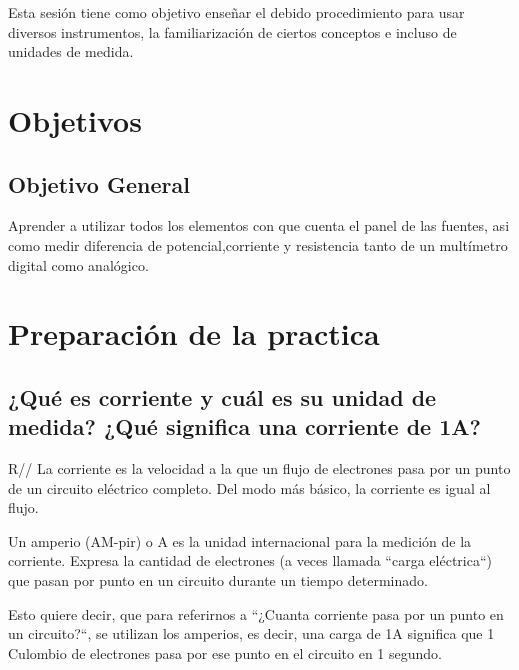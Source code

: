 \documentclass[letterpaper, 12pt]{report}
\begin{document}
Esta sesión tiene como objetivo enseñar el debido procedimiento
para usar diversos instrumentos, la familiarización de ciertos conceptos 
e incluso de unidades de medida.

\newpage

\section{Objetivos}

\subsection{Objetivo General}

Aprender a utilizar todos los elementos con que cuenta el panel de las 
fuentes, asi como medir diferencia de potencial,corriente y resistencia 
tanto de un multímetro digital como analógico.

\section{Preparación de la practica}

\subsection{¿Qué es corriente y cuál es su unidad de medida? ¿Qué significa
	una corriente de 1A?}

R// La corriente es la velocidad a la que un flujo de electrones pasa por un
punto de un circuito eléctrico completo. Del modo más básico,
la corriente es igual al flujo.~\cite{DefinicionCorrientePlusAmperio}

\vspace{.5cm}

Un amperio (AM-pir) o A es la unidad internacional para la medición de la
corriente. Expresa la cantidad de electrones
(a veces llamada ``carga eléctrica``) que pasan por punto en un circuito
durante un tiempo determinado.~\cite{DefinicionCorrientePlusAmperio}

\vspace{.5cm}

Esto quiere decir, que para referirnos a ``¿Cuanta corriente pasa por un
punto en un circuito?``, se utilizan los amperios, es decir, una carga de 1A
significa que 1 Culombio de electrones pasa por ese punto en el circuito en
1 segundo.~\cite{DefinicionCorrientePlusAmperio}
\end{document}
